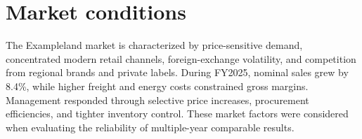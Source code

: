 \section{Market conditions}
The Exampleland market is characterized by price-sensitive demand, concentrated
modern retail channels, foreign-exchange volatility, and competition from
regional brands and private labels. During FY2025, nominal sales grew by 8.4\%,
while higher freight and energy costs constrained gross margins. Management
responded through selective price increases, procurement efficiencies, and
tighter inventory control. These market factors were considered when evaluating
the reliability of multiple-year comparable results.


